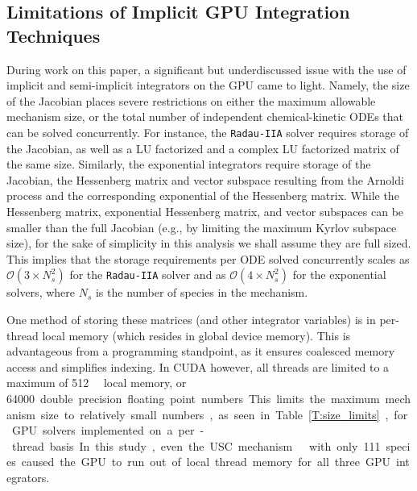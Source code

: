 \documentclass[preprint]{elsarticle}
\begin{document}
\subsection{Limitations of Implicit GPU Integration Techniques}
During work on this paper, a significant but underdiscussed issue with the use of implicit and semi-implicit integrators on the GPU came to light.
Namely, the size of the Jacobian places severe restrictions on either the maximum allowable mechanism size, or the total number of independent chemical-kinetic ODEs that can be solved concurrently.
For instance, the \texttt{Radau-IIA} solver requires storage of the Jacobian, as well as a LU factorized and a complex LU factorized matrix of the same size.
Similarly, the exponential integrators require storage of the Jacobian, the Hessenberg matrix and vector subspace resulting from the Arnoldi process and the corresponding exponential of the Hessenberg matrix.
While the Hessenberg matrix, exponential Hessenberg matrix, and vector subspaces can be smaller than the full Jacobian (e.g., by limiting the maximum Kyrlov subspace size), for the sake of simplicity in this analysis we shall assume they are full sized.
This implies that the storage requirements per ODE solved concurrently scales as $\mathcal{O}\left(3 \times N_s^2\right)$ for the \texttt{Radau-IIA} solver and as $\mathcal{O}\left(4 \times N_s^2\right)$ for the exponential solvers, where $N_s$ is the number of species in the mechanism.

One method of storing these matrices (and other integrator variables) is in per-thread local memory (which resides in global device memory).
This is advantageous from a programming standpoint, as it ensures coalesced memory access and simplifies indexing.
In CUDA however, all threads are limited to a maximum of \SI{512}{\kilo\byte} local memory, or \SI{64000} double precision floating point numbers.
This limits the maximum mechanism size to relatively small numbers, as seen in Table~\ref{T:size_limits}, for GPU solvers implemented on a per-thread basis.
In this study, even the USC mechanism ~\cite{Wang:2007} with only 111 species caused the GPU to run out of local thread memory for all three GPU integrators.
\end{document}
